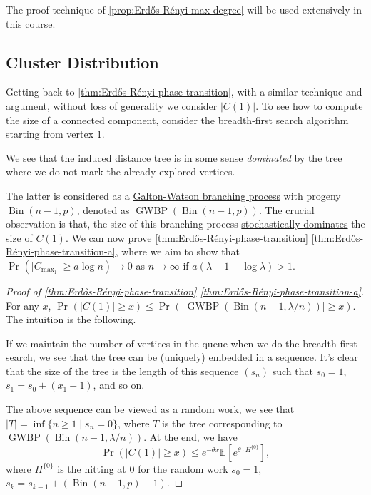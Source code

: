 \begin{remark}
	The proof technique of \autoref{prop:Erdős-Rényi-max-degree} will be used extensively in this course.
\end{remark}

\subsection{Cluster Distribution}
Getting back to \autoref{thm:Erdős-Rényi-phase-transition}, with a similar technique and argument, without loss of generality we consider \(\lvert C(1) \rvert \). To see how to compute the size of a connected component, consider the breadth-first search algorithm starting from vertex \(1\).

\begin{intuition}
	We see that the induced distance tree is in some sense \emph{dominated} by the tree where we do not mark the already explored vertices.
\end{intuition}

The latter is considered as a \href{https://en.wikipedia.org/wiki/Galton%E2%80%93Watson_process}{Galton-Watson branching process} with progeny \(\operatorname{Bin}(n-1, p) \), denoted as \(\operatorname{GWBP}(\operatorname{Bin}(n-1, p) ) \). The crucial observation is that, the size of this branching process \hyperref[def:stochastic-domination]{stochastically dominates} the size of \(C(1)\). We can now prove \autoref{thm:Erdős-Rényi-phase-transition} \autoref{thm:Erdős-Rényi-phase-transition-a}, where we aim to show that \(\Pr_{}(\lvert C_{\max _1} \rvert \geq a \log n) \to 0\) as \(n \to \infty \) if \(a(\lambda - 1 - \log \lambda ) > 1\).

\begin{proof}[Proof of \autoref{thm:Erdős-Rényi-phase-transition} \autoref{thm:Erdős-Rényi-phase-transition-a}]
	For any \(x\), \(\Pr_{}(\lvert C(1) \rvert \geq x) \leq \Pr_{}(\lvert \operatorname{GWBP}(\operatorname{Bin}(n-1, \lambda / n) )  \rvert \geq x) \). The intuition is the following.

	\begin{intuition}
		If we maintain the number of vertices in the queue when we do the breadth-first search, we see that the tree can be (uniquely) embedded in a sequence. It's clear that the size of the tree is the length of this sequence \((s_n)\) such that \(s_0 = 1\), \(s_1 = s_0 + (x_1 - 1)\), and so on.
	\end{intuition}

	The above sequence can be viewed as a random work, we see that \(\lvert T \rvert = \inf \{ n \geq 1 \mid s_n = 0 \} \), where \(T\) is the tree corresponding to \(\operatorname{GWBP}(\operatorname{Bin}(n-1, \lambda / n) ) \). At the end, we have
	\[
		\Pr_{}(\lvert C(1) \rvert \geq x)
		\leq e^{-\theta x } \mathbb{E}_{}[e^{\theta \cdot H^{\{ 0 \} }}] ,
	\]
	where \(H^{\{ 0 \} }\) is the hitting at \(0\) for the random work \(s_0 = 1\), \(s_k = s_{k-1} + (\operatorname{Bin}(n-1, p) - 1)\).
\end{proof}

